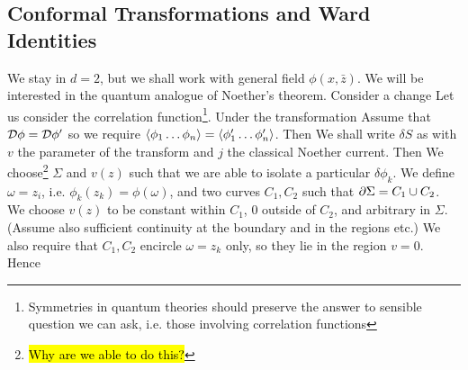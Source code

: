 \documentclass{article}
\begin{document}
\subsection{Conformal Transformations and Ward Identities}
We stay in $d=2$, but we shall work with general field $\phi(x,\bar{z})$. We will be interested in the quantum analogue of Noether's theorem. Consider a change 
Let us consider the correlation function\footnote{Symmetries in quantum theories should preserve the answer to sensible question we can ask, i.e. those involving correlation functions}.
Under the transformation 
Assume that $\mathcal{D} \phi = \mathcal{D} \phi^\prime$ so 
we require $\braket{\phi_1 \dots \phi_n} = \braket{\phi_1^\prime \dots \phi_n^\prime}$. Then 
We shall write $\delta S$ as 
with $v$ the parameter of the transform and $j$ the classical Noether current. Then 
We choose\footnote{\hl{Why are we able to do this?}} $\Sigma$ and $v(z)$ such that we are able to isolate a particular $\delta \phi_k$. We define $\omega = z_i $, i.e. $\phi_k(z_k) = \phi(\omega)$, and two curves $C_1, C_2$ such that $\partial \Sigma = C_1 \cup C_2$. We choose $v(z)$ to be constant within $C_1$, 0 outside of $C_2$, and arbitrary in $\Sigma$. (Assume also sufficient continuity at the boundary and in the regions etc.) We also require that $C_1, C_2$ encircle $\omega=z_k$ only, so they lie in the region $v=0$. Hence 
\end{document}
